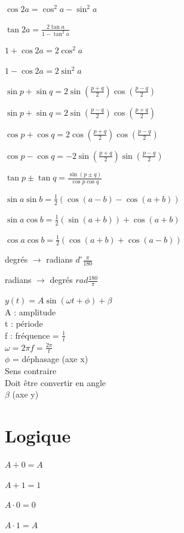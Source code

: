 \documentclass[a4paper,12pt]{article}
\newcommand\tab[1][]{\hspace*{#1}}
\newcommand\Warning{%
 \makebox[1.4em][c]{%
 \makebox[0pt][c]{\raisebox{.1em}{\small!}}%
 \makebox[0pt][c]{\color{red}\Large$\bigtriangleup$}}}%
\begin{document}
$\cos 2a = \cos^2a - \sin^2a$

$\tan 2a = \frac{2\tan a}{1-\tan^2a}$ 

\vspace{\baselineskip}
$1 + \cos 2a = 2\cos^2 a$

$1 - \cos 2a = 2\sin^2 a$

\vspace{\baselineskip}
$\sin p + \sin q = 2\sin(\frac{p+q}{2}) \cos(\frac{p-q}{2})$

$\sin p + \sin q = 2\sin(\frac{p-q}{2}) \cos(\frac{p+q}{2})$

$\cos p + \cos q = 2\cos(\frac{p+q}{2}) \cos(\frac{p-q}{2})$

$\cos p - \cos q = -2\sin(\frac{p+q}{2}) \sin(\frac{p-q}{2})$

$\tan p \pm \tan q = \frac{\sin(p \pm q)}{\cos p \cos q}$

\newpage
$\sin a \sin b = \frac{1}{2}(\cos(a-b)-\cos(a+b))$

$\sin a \cos b = \frac{1}{2}(\sin(a+b))+\cos(a+b)$

$\cos a \cos b = \frac{1}{2}(\cos(a+b)+\cos(a-b))$

\vspace{\baselineskip}
degrés $\rightarrow$ radians $d^\circ \frac{\pi}{180}$

radians $\rightarrow$ degrés $rad\frac{180}{\pi}$ 

\vspace{\baselineskip}
$y(t) = A\sin(\omega t+\phi ) + \beta$\\
\tab[1cm] A : amplitude \\
\tab[1cm] t : période \\
\tab[1cm] f : fréquence = $\frac{1}{t}$ \\
\tab[1cm] $\omega = 2\pi f = \frac{2\pi}{t}$ \\
\tab[1cm] $\phi$ = déphasage (axe x) \\ 
\tab[2cm]\Warning Sens contraire \\
\tab[2cm]\Warning Doit être convertir en angle\\
\tab[1cm] $\beta$ (axe y)

\newpage
\section{Logique}
$A + 0 = A$

$A + 1 = 1$

$A \cdot 0 = 0$

$A \cdot 1 = A$
\end{document}
